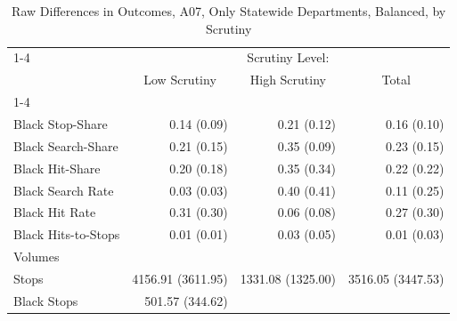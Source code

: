 \begin{table}[!h]
\caption{Raw Differences in Outcomes, A07, Only Statewide Departments, Balanced, by Scrutiny}
\centering
\begin{tabular}{llll}
\cline{1-4}
\multicolumn{1}{r}{} &
  \multicolumn{3}{c}{Scrutiny Level:} \\
\multicolumn{1}{r}{} &
  \multicolumn{1}{c}{Low Scrutiny} &
  \multicolumn{1}{c}{High Scrutiny} &
  \multicolumn{1}{c}{Total} \\
\cline{1-4}
\multicolumn{1}{l}{Rates} &
  \multicolumn{1}{r}{} &
  \multicolumn{1}{r}{} &
  \multicolumn{1}{r}{} \\
\multicolumn{1}{l}{\hspace{1em}Black Stop-Share} &
  \multicolumn{1}{r}{0.14 (0.09)} &
  \multicolumn{1}{r}{0.21 (0.12)} &
  \multicolumn{1}{r}{0.16 (0.10)} \\
\multicolumn{1}{l}{\hspace{1em}Black Search-Share} &
  \multicolumn{1}{r}{0.21 (0.15)} &
  \multicolumn{1}{r}{0.35 (0.09)} &
  \multicolumn{1}{r}{0.23 (0.15)} \\
\multicolumn{1}{l}{\hspace{1em}Black Hit-Share} &
  \multicolumn{1}{r}{0.20 (0.18)} &
  \multicolumn{1}{r}{0.35 (0.34)} &
  \multicolumn{1}{r}{0.22 (0.22)} \\
\multicolumn{1}{l}{\hspace{1em}Black Search Rate} &
  \multicolumn{1}{r}{0.03 (0.03)} &
  \multicolumn{1}{r}{0.40 (0.41)} &
  \multicolumn{1}{r}{0.11 (0.25)} \\
\multicolumn{1}{l}{\hspace{1em}Black Hit Rate} &
  \multicolumn{1}{r}{0.31 (0.30)} &
  \multicolumn{1}{r}{0.06 (0.08)} &
  \multicolumn{1}{r}{0.27 (0.30)} \\
\multicolumn{1}{l}{\hspace{1em}Black Hits-to-Stops} &
  \multicolumn{1}{r}{0.01 (0.01)} &
  \multicolumn{1}{r}{0.03 (0.05)} &
  \multicolumn{1}{r}{0.01 (0.03)} \\
\multicolumn{1}{l}{Volumes} &
  \multicolumn{1}{r}{} &
  \multicolumn{1}{r}{} &
  \multicolumn{1}{r}{} \\
\multicolumn{1}{l}{\hspace{1em}Stops} &
  \multicolumn{1}{r}{4156.91 (3611.95)} &
  \multicolumn{1}{r}{1331.08 (1325.00)} &
  \multicolumn{1}{r}{3516.05 (3447.53)} \\
\multicolumn{1}{l}{\hspace{1em}Black Stops} &
  \multicolumn{1}{r}{501.57 (344.62)} &

\end{tabular}
\end{table}
